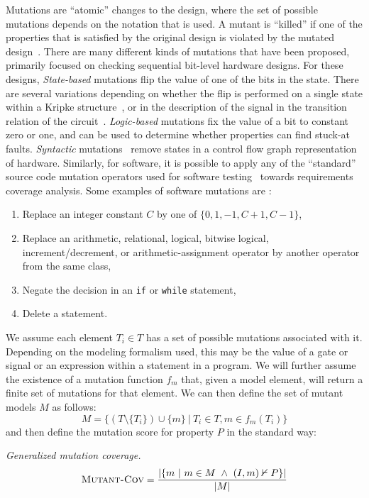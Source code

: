 \iffalse
Mutations are ``atomic'' changes to the design, where the set of possible mutations depends on the notation that is used.  A mutant is ``killed'' if one of the properties that is satisfied by the original design is violated by the mutated design~\cite{chockler_coverage_2003,chockler2001practical,chockler2010coverage,Kupferman:2006:SCF,kupferman_theory_2008}.  There are many different kinds of mutations that have been proposed, primarily focused on checking sequential bit-level hardware designs.
For these designs, {\em State-based} mutations flip the value of one of the bits in the state.  There are several variations depending on whether the flip is performed on a single state within a Kripke structure~\cite{hoskote1999coverage}, or in the description of the signal in the transition relation of the circuit~\cite{chockler2001practical}.  {\em Logic-based} mutations fix the value of a bit to constant zero or one, and can be used to determine whether properties can find stuck-at faults.  {\em Syntactic} mutations~\cite{chockler_coverage_2003} remove states in a control flow graph representation of hardware.
Similarly, for software, it is possible to apply any of the ``standard'' source code mutation operators used for software testing~\cite{Andrews06:mutation} towards requirements coverage analysis.
Some examples of software mutations are \cite{Budd:1980}:
\begin{enumerate}
    \item Replace an integer constant $C$ by one of $\{0, 1, -1, C + 1, C - 1\}$,
    \item Replace an arithmetic, relational, logical, bitwise logical, increment/decrement, or arithmetic-assignment operator by another operator from the same class,
    \item Negate the decision in an \texttt{if} or \texttt{while} statement,
    \item Delete a statement.
\end{enumerate}

We assume each element $T_i \in T$ has a set of possible mutations associated with it.  Depending on the modeling formalism used, this may be the value of a gate or signal or an expression within a statement in a program.  We will further assume the existence of a mutation function $f_{m}$ that, given a model element, will return a finite set of mutations for that element.  We can then define the set of mutant models $M$ as follows:
\[
    M = \{ (T \setminus \{T_i\}) \cup \{m\} \ |\ T_i \in T, m \in f_{m}(T_i) \}
\]
\noindent and then define the mutation score for property $P$ in the standard way:
\begin{definition} {\emph{Generalized mutation coverage.} } \\
\[
   \text{\sc Mutant-Cov} = \frac{ | \{m~|~ m \in M~\land~(I, m) \nvdash P\} |}{|M|}
\]
\end{definition}


